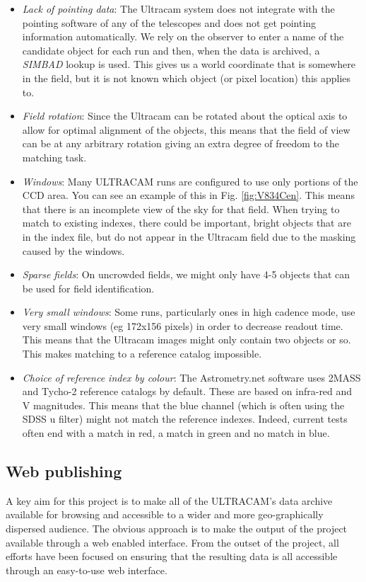\begin{itemize}
	\item \emph{Lack of pointing data}: The Ultracam system does not integrate with the pointing software of any of the telescopes and does not get pointing information automatically. We rely on the observer to enter a name of the candidate object for each run and then, when the data is archived, a \emph{SIMBAD} lookup is used. This gives us a world coordinate that is somewhere in the field, but it is not known which object (or pixel location) this applies to.  
	\item \emph{Field rotation}: Since the Ultracam can be rotated about the optical axis to allow for optimal alignment of the objects, this means that the field of view can be at any arbitrary rotation giving an extra degree of freedom to the matching task. 
	\item \emph{Windows}: Many ULTRACAM runs are configured to use only portions of the CCD area. You can see an example of this in Fig.  \ref{fig:V834Cen}. This means that there is an incomplete view of the sky for that field. When trying to match to existing indexes, there could be important, bright objects that are in the index file, but do not appear in the Ultracam field due to the masking caused by the windows.
	\item \emph{Sparse fields}: On uncrowded fields, we might only have 4-5 objects that can be used for field identification. 
	\item \emph{Very small windows}: Some runs, particularly ones in high cadence mode, use very small windows (eg 172x156 pixels) in order to decrease readout time. This means that the Ultracam images might only contain two objects or so. This makes matching to a reference catalog impossible. 
	\item \emph{Choice of reference index by colour}: The Astrometry.net software uses 2MASS and Tycho-2 reference catalogs by default. These are based on infra-red and V magnitudes. This means that the blue channel (which is often using the SDSS u filter) might not match the reference indexes. Indeed, current tests often end with a match in red, a match in green and no match in blue. 
\end{itemize}

\subsection{Web publishing}
A key aim for this project is to make all of the ULTRACAM's data archive available for browsing and accessible to a wider and more geo-graphically dispersed audience. The obvious approach is to make the output of the project available through a web enabled interface. From the outset of the project, all efforts have been focused on ensuring that the resulting data is all accessible through an easy-to-use web interface. 

